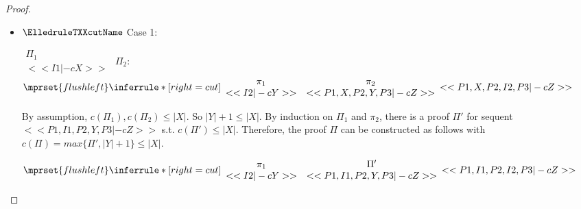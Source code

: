 \begin{proof}
\begin{enumerate}
\begin{itemize}
    \item $\ElledruleTXXcutName$ Case 1:
      \begin{center}
        \scriptsize
        \begin{math}
          \begin{array}{c}
            \Pi_1 \\
            {<<I1 |-c X>>}
          \end{array}
        \end{math}
        \qquad\qquad
        $\Pi_2$:
        \begin{math}
          $$\mprset{flushleft}
          \inferrule* [right={\tiny cut}] {
            {
              \begin{array}{cc}
                \pi_1 & \pi_2 \\
                {<<I2 |-c Y>>} & {<<P1, X, P2, Y, P3 |-c Z>>}
              \end{array}
            }
          }{<<P1, X, P2, I2, P3 |-c Z>>}
        \end{math}
      \end{center}
      By assumption, $c(\Pi_1),c(\Pi_2)\leq |X|$. So $|Y|+1 \leq |X|$. By induction on $\Pi_1$
      and $\pi_2$, there is a proof $\Pi'$ for sequent $<<P1, I1, P2, Y, P3 |-c Z>>$ s.t.
      $c(\Pi') \leq |X|$. Therefore, the proof $\Pi$ can be constructed as follows with
      $c(\Pi) = max\{\Pi', |Y|+1\} \leq |X|$.
      \begin{center}
        \scriptsize
        \begin{math}
          $$\mprset{flushleft}
          \inferrule* [right={\tiny cut}] {
            {
              \begin{array}{cc}
                \pi_1 & \Pi' \\
                {<<I2 |-c Y>>} & {<<P1, I1, P2, Y, P3 |-c Z>>}
              \end{array}
            }
          }{<<P1, I1, P2, I2, P3 |-c Z>>}
        \end{math}
      \end{center}


\end{itemize}
\end{enumerate}
\end{proof}
